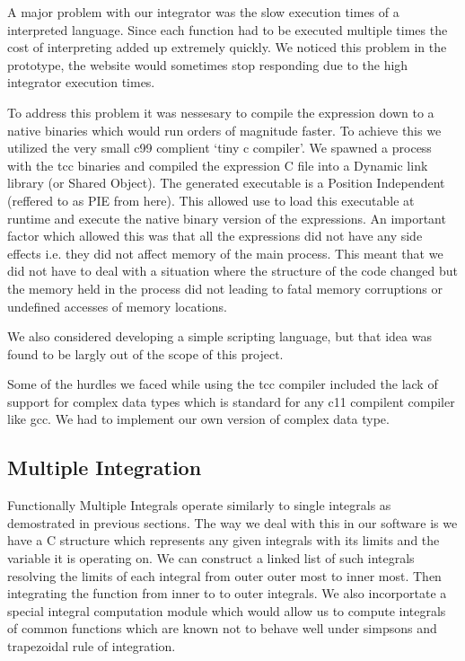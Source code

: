 \documentclass[12pt]{article}
\begin{document}
A major problem with our integrator was the slow execution times of a interpreted language. Since each function
had to be executed multiple times the cost of interpreting added up extremely quickly. We noticed this problem in
the prototype, the website would sometimes stop responding due to the high integrator execution times.

To address this problem it was nessesary to compile the expression down to a native binaries which would run orders
of magnitude faster. To achieve this we utilized the very small c99 complient `tiny c compiler'\cite{ab}.
We spawned a process with the tcc binaries and compiled the expression C file into a Dynamic link library (or Shared Object).
The generated executable is a Position Independent (reffered to as PIE from here). This allowed use to load this executable at runtime
and execute the native binary version of the expressions. An important factor which allowed this was that all the expressions did not have
any side effects i.e. they did not affect memory of the main process. This meant that we did not have to deal with a situation where the
structure of the code changed but the memory held in the process did not leading to fatal memory corruptions or undefined accesses of memory
locations.

We also considered developing a simple scripting language, but that idea was found to be largly out of the scope of this project.

Some of the hurdles we faced while using the tcc compiler included the lack of support for complex data types which is standard for any c11 compilent
compiler like gcc. We had to implement our own version of complex data type.

\subsection{Multiple Integration}

Functionally Multiple Integrals operate similarly to single integrals as demostrated in previous sections. The way we deal with this in our software is
we have a C structure which represents any given integrals with its limits and the variable it is operating on. We can construct a linked list of such integrals
resolving the limits of each integral from outer outer most to inner most. Then integrating the function from inner to to outer integrals. We also incorportate
a special integral computation module which would allow us to compute integrals of common functions which are known not to behave well under simpsons and 
trapezoidal rule of integration.
\end{document}
